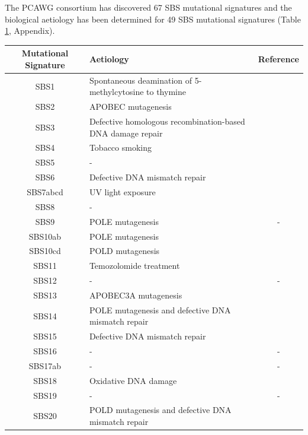 The PCAWG consortium has discovered 67 SBS mutational signatures \cite{Alexandrov2020-ys} and the biological aetiology has been determined for 49 SBS mutational signatures (Table \ref{tab:pcawg-mutational-signatures}, Appendix). 

\begingroup
\setlength{\LTleft}{-10cm plus -1fill} %
\setlength{\LTright}{\LTleft}
\begin{longtable}{c|p{10cm}|c}
\label{tab:pcawg-mutational-signatures} \\ \smallskip
Mutational Signature & Aetiology & Reference \\ \hline

SBS1 & Spontaneous deamination of 5-methylcytosine to thymine & \cite{Alexandrov2015-db} \\ \hline
SBS2 & APOBEC mutagenesis & \cite{Burns2013-xn} \\ \hline
SBS3 & Defective homologous recombination-based DNA damage repair & \cite{Zamborszky2017-ma} \\ \hline
SBS4 & Tobacco smoking & \cite{Alexandrov2016-uw} \\ \hline
SBS5 & - & \cite{Alexandrov2015-db} \\ \hline
SBS6 & Defective DNA mismatch repair & \cite{Meier2018-cj} \\ \hline
SBS7abcd & UV light exposure & \cite{Nik-Zainal2015-bj} \\ \hline
SBS8 & - & \\ \hline
SBS9 & POLE mutagenesis & - \\ \hline
SBS10ab & POLE mutagenesis & \cite{Robinson2021-te} \\ \hline
SBS10cd & POLD mutagenesis & \cite{Robinson2021-te} \\ \hline
SBS11 & Temozolomide treatment & \cite{Kucab2019-fy} \\ \hline
SBS12 & - & - \\ \hline
SBS13 & APOBEC3A mutagenesis & \cite{Chan2015-sk} \\ \hline
SBS14 & POLE mutagenesis and defective DNA mismatch repair & \cite{Hodel2020-je} \\ \hline
SBS15 & Defective DNA mismatch repair & \cite{Meier2018-cj} \\ \hline
SBS16 & - & - \\ \hline
SBS17ab & - & - \\ \hline
SBS18 & Oxidative DNA damage & \cite{Kucab2019-fy} \\ \hline
SBS19 & - & - \\ \hline
SBS20 & POLD mutagenesis and defective DNA mismatch repair  & \cite{Meier2018-cj} \\ \hline

\end{longtable}

